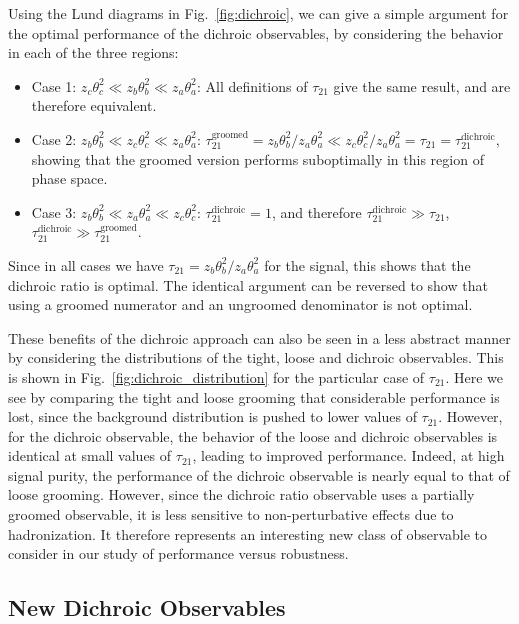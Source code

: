 \documentclass[11pt,letterpaper]{article}
\newcommand{\dichroic}{\text{dichroic}}
\newcommand{\groomed}{\text{groomed}}
\DeclareRobustCommand{\Fig}[1]{Fig.~\ref{#1}}
\begin{document}
Using the Lund diagrams in \Fig{fig:dichroic}, we can give a simple argument for the optimal performance of the dichroic observables, by considering the behavior in each of the three regions:
\begin{itemize}
\item Case 1: $z_c \theta_c^2 \ll z_b \theta_b^2 \ll z_a \theta_a^2$: All definitions of $\tau_{21}$ give the same result, and are therefore equivalent.
\item Case 2: $z_b\theta_b^2 \ll z_c \theta_c^2 \ll z_a \theta_a^2$: $\tau_{21}^\groomed=z_b \theta_b^2/z_a \theta_a^2 \ll  z_c \theta_c^2/z_a \theta_a^2=\tau_{21}=\tau_{21}^\dichroic$, showing that the groomed version performs suboptimally in this region of phase space.
\item Case 3: $z_b \theta_b^2 \ll z_a \theta_a^2 \ll z_c \theta_c^2$: $\tau_{21}^\dichroic=1$, and therefore $\tau_{21}^\dichroic \gg \tau_{21}$, $\tau_{21}^\dichroic \gg \tau_{21}^\groomed$. 
\end{itemize}
Since in all cases we have $\tau_{21}=z_b\theta_b^2/z_a\theta_a^2$ for
the signal, this shows that the dichroic
ratio is optimal.
%
The identical argument can be reversed to show that
using a groomed numerator and an ungroomed denominator is not optimal.

These benefits of the dichroic approach can also be seen in a less abstract manner by considering the distributions of the tight, loose and dichroic observables. This is shown in \Fig{fig:dichroic_distribution} for the particular case of $\tau_{21}$. Here we see by comparing the tight and loose grooming that considerable performance is lost, since the background distribution is pushed to lower values of $\tau_{21}$. However, for the dichroic observable, the behavior of the loose and dichroic observables is identical at small values of $\tau_{21}$, leading to improved performance. Indeed, at high signal purity, the performance of the dichroic observable is nearly equal to that of loose grooming. However, since the dichroic ratio observable uses a partially groomed observable, it is less sensitive to non-perturbative effects due to hadronization.
%
It therefore represents an interesting new class of observable to consider in our study of performance versus robustness. 

\subsection{New Dichroic Observables}\label{sec:dichroic_new}
\end{document}
